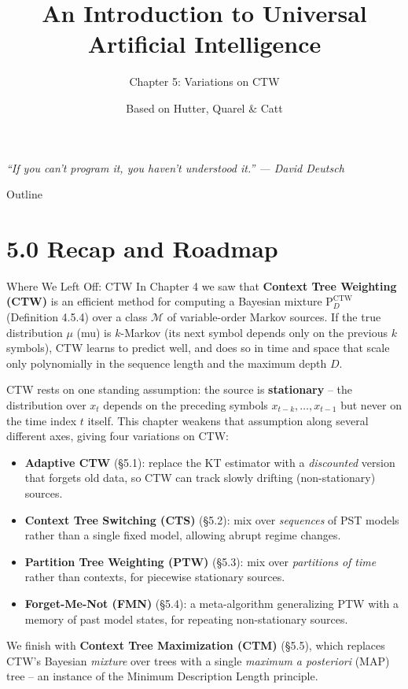 \documentclass[aspectratio=169,10pt]{beamer}
\title[UAI -- Ch.5 Variations on CTW]{An Introduction to Universal Artificial Intelligence}
\subtitle{Chapter 5: Variations on CTW}
\author{Based on Hutter, Quarel \& Catt}
\institute{CRC Press, 2024}
\date{}
\newcommand{\CTW}{\mathrm{CTW}}
\begin{document}

\begin{frame}
  \titlepage
  \begin{center}
  \footnotesize\itshape ``If you can't program it, you haven't understood it.'' --- David Deutsch
  \end{center}
\end{frame}

\begin{frame}{Outline}
  \tableofcontents
\end{frame}

\section{5.0 Recap and Roadmap}
\begin{frame}[allowframebreaks]{Where We Left Off: CTW}
  In Chapter 4 we saw that \textbf{Context Tree Weighting (CTW)} is an
  efficient method for computing a Bayesian mixture $\mathrm{P}_D^{\CTW}$
  (Definition 4.5.4) over a class $\mathcal{M}$ of variable-order Markov
  sources. If the true distribution $\mu$ (mu) is $k$-Markov (its next symbol
  depends only on the previous $k$ symbols), CTW learns to predict well, and
  does so in time and space that scale only polynomially in the sequence
  length and the maximum depth $D$.

  \medskip
  CTW rests on one standing assumption: the source is \textbf{stationary} --
  the distribution over $x_t$ depends on the preceding symbols
  $x_{t-k},\dots,x_{t-1}$ but never on the time index $t$ itself. This
  chapter weakens that assumption along several different axes, giving four
  variations on CTW:

  \begin{itemize}
    \item \textbf{Adaptive CTW} (\S5.1): replace the KT estimator with a
      \emph{discounted} version that forgets old data, so CTW can track
      slowly drifting (non-stationary) sources.
    \item \textbf{Context Tree Switching (CTS)} (\S5.2): mix over
      \emph{sequences} of PST models rather than a single fixed model,
      allowing abrupt regime changes.
    \item \textbf{Partition Tree Weighting (PTW)} (\S5.3): mix over
      \emph{partitions of time} rather than contexts, for piecewise
      stationary sources.
    \item \textbf{Forget-Me-Not (FMN)} (\S5.4): a meta-algorithm generalizing
      PTW with a memory of past model states, for repeating non-stationary
      sources.
  \end{itemize}
  We finish with \textbf{Context Tree Maximization (CTM)} (\S5.5), which
  replaces CTW's Bayesian \emph{mixture} over trees with a single
  \emph{maximum a posteriori} (MAP) tree -- an instance of the Minimum
  Description Length principle.
\end{frame}
\end{document}
